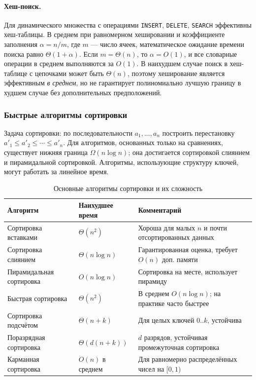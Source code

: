 \documentclass[a4paper,12pt]{article}
\begin{document}
\paragraph*{Хеш-поиск.}
Для динамического множества с операциями \texttt{INSERT}, \texttt{DELETE}, \texttt{SEARCH} эффективны хеш-таблицы. В среднем при равномерном хешировании и коэффициенте заполнения \(\alpha=n/m\), где \(m\) — число ячеек, математическое ожидание времени поиска равно \(\Theta(1+\alpha)\). Если \(m=\Theta(n)\), то \(\alpha=O(1)\), и все словарные операции в среднем выполняются за \(O(1)\). В наихудшем случае поиск в хеш-таблице с цепочками может быть \(\Theta(n)\), поэтому хеширование является эффективным \emph{в среднем}, но не гарантирует полиномиально лучшую границу в худшем случае без дополнительных предположений.

\subsubsection*{Быстрые алгоритмы сортировки}

Задача сортировки: по последовательности \(a_1,\dots,a_n\) построить перестановку \(a'_1\le a'_2\le\cdots\le a'_n\). Для алгоритмов, основанных только на сравнениях, существует нижняя граница \(\Omega(n\log n)\); она достигается сортировкой слиянием и пирамидальной сортировкой. Алгоритмы, использующие структуру ключей, могут работать за линейное время.

\begin{table}[h]
\centering
\small
\begin{tabular}{@{}lll@{}}
\toprule
Алгоритм & Наихудшее время & Комментарий \\
\midrule
Сортировка вставками & \(\Theta(n^2)\) & Хороша для малых \(n\) и почти отсортированных данных \\
Сортировка слиянием & \(\Theta(n\log n)\) & Гарантированная оценка, требует \(O(n)\) доп. памяти \\
Пирамидальная сортировка & \(O(n\log n)\) & Сортировка на месте, использует пирамиду \\
Быстрая сортировка & \(\Theta(n^2)\) & В среднем \(O(n\log n)\); на практике часто быстрее \\
Сортировка подсчётом & \(\Theta(n+k)\) & Для целых ключей \(0..k\), устойчива \\
Поразрядная сортировка & \(\Theta(d(n+k))\) & \(d\) разрядов, устойчивая промежуточная сортировка \\
Карманная сортировка & \(O(n)\) в среднем & Для равномерно распределённых чисел на \([0,1)\) \\
\bottomrule
\end{tabular}
\caption{Основные алгоритмы сортировки и их сложность}
\end{table}
\end{document}
